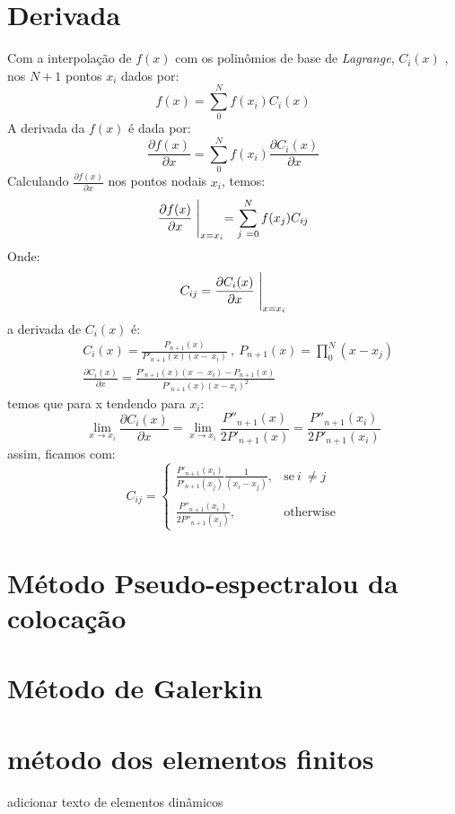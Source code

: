 \section{Derivada}
 Com a interpolação de $f(x)$ com os polinômios de base de \emph{Lagrange}, $C_i(x)$ , nos $N+1$ pontos $x_i$ dados por:
 \begin{equation}
 f(x)  = \sum^{N}_{0} f(x_i) C_i(x)
 \end{equation}
 A derivada da $f(x)$ é dada por:
 \begin{equation}
 \frac{\partial f(x)}{\partial x} = \sum^{N}_{0} f(x_i) \frac{\partial C_i(x)}{\partial x}
 \end{equation}
 Calculando $\frac{\partial f(x)}{\partial x}$ nos pontos nodais $x_i$, temos:
\begin{equation}
   \frac{\partial f(x)}{\partial x}  \Biggm\lvert_{x=x_i} = \sum^{N}_{j\ = 0} f(x_j) C_{ij}
\end{equation}
 Onde:
 \begin{equation}
  C_{ij} = \frac{\partial C_i(x)}{\partial x} \Biggm\lvert_{x=x_i}
 \end{equation}
 a derivada de $C_i(x)$ é:
 \begin{align}
 &C_i(x) = \frac{P_{n+1}(x)}{P'_{n+1}(x)(x -\ x_i)}\ ,\ P_{n+1}(x) = \prod^{N}_{0} (x - x_j)\\
 &\frac{\partial C_i(x)}{\partial x} =  \frac{P'_{n+1}(x)(x\ -\ x_i) - P_{n+1}(x)}{P'_{n+1}(x)(x - x_i)^2}\ 
 \end{align}
 temos que para x tendendo para $x_i$:
 \begin{equation}
 \lim_{x \rightarrow x_i}  \frac{\partial C_i(x)}{\partial x} =  \lim_{x \rightarrow x_i} \frac{P''_{n+1}(x)}{2P'_{n+1}(x)} = \frac{P''_{n+1}(x_i)}{2P'_{n+1}(x_i)}
 \end{equation}
 assim, ficamos com:
 \begin{equation}
 C_{ij}= 
\begin{cases}
    \frac{P'_{n+1}(x_i)}{P'_{n+1}(x_j)} \frac{1}{(x_i - x_j)},& \text{se}\ i\ \neq  j\\\\
    \frac{P''_{n+1}(x_i)}{2P''_{n+1}(x_j)},              & \text{otherwise}
\end{cases}
 \end{equation}




\section{Método Pseudo-espectralou da colocação}

\section{Método de Galerkin}

\section{método dos elementos finitos}
adicionar texto de elementos dinâmicos